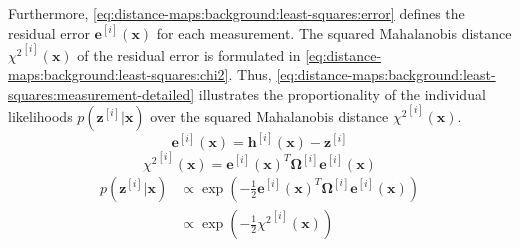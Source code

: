Furthermore, \eqref{eq:distance-maps:background:least-squares:error} defines
the residual error $\mathbf{e}^{[i]}(\mathbf{x})$ for each measurement.
The squared Mahalanobis distance ${\chi^2}^{[i]}(\mathbf{x})$ of the residual
error is formulated in \eqref{eq:distance-maps:background:least-squares:chi2}.
Thus, \eqref{eq:distance-maps:background:least-squares:measurement-detailed}
illustrates the proportionality of the individual likelihoods
$p(\mathbf{z}^{[i]}|\mathbf{x})$ over the squared Mahalanobis distance
${\chi^2}^{[i]}(\mathbf{x})$.
\begin{equation}\label{eq:distance-maps:background:least-squares:error}
\mathbf{e}^{[i]}(\mathbf{x})=\mathbf{h}^{[i]}(\mathbf{x}) - \mathbf{z}^{[i]}
\end{equation}
\begin{equation}\label{eq:distance-maps:background:least-squares:chi2}
{\chi^2}^{[i]}(\mathbf{x}) =
\mathbf{e}^{[i]}(\mathbf{x})^T \mathbf{\Omega}^{[i]} \mathbf{e}^{[i]}(\mathbf{x})
\end{equation}
\begin{equation}
\label{eq:distance-maps:background:least-squares:measurement-detailed}
\begin{aligned}
p(\mathbf{z}^{[i]}|\mathbf{x})
  & \propto \exp\!\left(
      -\frac{1}{2}
      \mathbf{e}^{[i]}(\mathbf{x})^T
      \mathbf{\Omega}^{[i]}
      \mathbf{e}^{[i]}(\mathbf{x})
  \right)\\
  & \propto \exp\!\left(-\frac{1}{2}{\chi^2}^{[i]}(\mathbf{x})\right)
\end{aligned}
\end{equation}


